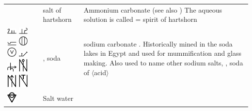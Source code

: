 \documentclass[british,final,landscape]{scrartcl}
\begin{document}
\begin{refsection}
\begin{supertabular}{p{0.3\textwidth}p{0.34\textwidth}p{0.34\textwidth}}
   & salt of hartshorn & Ammonium carbonate  (see also ) The aqueous solution is called  = spirit of hartshorn \\
   \includegraphics[width=5mm]{Compounds/Soda} \includegraphics[width=5mm]{Compounds/Soda2} \includegraphics[width=5mm]{Compounds/Soda3} \includegraphics[width=5mm]{Compounds/Soda4} \includegraphics[width=5mm]{Compounds/Soda5} \includegraphics[width=5mm]{Compounds/Soda6} \includegraphics[width=5mm]{Compounds/Soda7} \includegraphics[width=5mm]{Compounds/Soda8} \includegraphics[width=5mm]{Compounds/Soda9} \includegraphics[width=5mm]{Compounds/Soda10} & , soda & sodium carbonate . Historically mined in the soda lakes in Egypt and used for mummification and glass making. Also used to name other sodium salts, , soda of \(\langle\)acid\(\rangle\) \\
   \includegraphics[width=5mm]{Compounds/SaltWater} & Salt water & \\

\end{supertabular}
\end{refsection}
\end{document}
